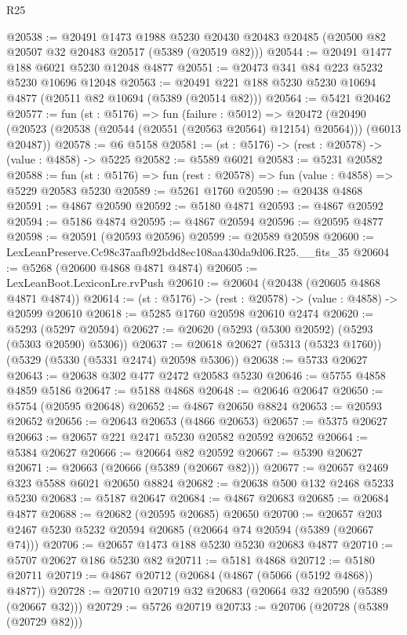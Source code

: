 \begin{lexlean}{R25}
\begin{coremodule}
@20538 := @20491
    @1473
    @1988
    @5230
    @20430
    @20483
    @20485
    (@20500 @82 @20507 @32 @20483 @20517 (@5389 (@20519 @82)))
@20544 := @20491 @1477 @188 @6021 @5230 @12048 @4877
@20551 := @20473 @341 @84 @223 @5232 @5230 @10696 @12048
@20563 := @20491 @221 @188 @5230 @5230 @10694 @4877 (@20511 @82 @10694 (@5389 (@20514 @82)))
@20564 := @5421 @20462
@20577 := fun (st : @5176) =>
  fun (failure : @5012) =>
  @20472 (@20490 (@20523 (@20538 (@20544 (@20551 (@20563 @20564) @12154) @20564))) (@6013 @20487))
@20578 := @6 @5158
@20581 := (st : @5176) -> (rest : @20578) -> (value : @4858) -> @5225
@20582 := @5589 @6021
@20583 := @5231 @20582
@20588 := fun (st : @5176) => fun (rest : @20578) => fun (value : @4858) => @5229 @20583 @5230
@20589 := @5261 @1760
@20590 := @20438 @4868
@20591 := @4867 @20590
@20592 := @5180 @4871
@20593 := @4867 @20592
@20594 := @5186 @4874
@20595 := @4867 @20594
@20596 := @20595 @4877
@20598 := @20591 (@20593 @20596)
@20599 := @20589 @20598
@20600 := LexLeanPreserve.Cc98c37aafb92bdd8ec108aa430da9d06.R25.__fits_35
@20604 := @5268 (@20600 @4868 @4871 @4874)
@20605 := LexLeanBoot.LexiconLre.rvPush
@20610 := @20604 (@20438 (@20605 @4868 @4871 @4874))
@20614 := (st : @5176) -> (rest : @20578) -> (value : @4858) -> @20599 @20610
@20618 := @5285 @1760 @20598 @20610 @2474
@20620 := @5293 (@5297 @20594)
@20627 := @20620 (@5293 (@5300 @20592) (@5293 (@5303 @20590) @5306))
@20637 := @20618 @20627 (@5313 (@5323 @1760)) (@5329 (@5330 (@5331 @2474) @20598 @5306))
@20638 := @5733 @20627
@20643 := @20638 @302 @477 @2472 @20583 @5230
@20646 := @5755 @4858 @4859 @5186
@20647 := @5188 @4868
@20648 := @20646 @20647
@20650 := @5754 (@20595 @20648)
@20652 := @4867 @20650 @8824
@20653 := @20593 @20652
@20656 := @20643 @20653 (@4866 @20653)
@20657 := @5375 @20627
@20663 := @20657 @221 @2471 @5230 @20582 @20592 @20652
@20664 := @5384 @20627
@20666 := @20664 @82 @20592
@20667 := @5390 @20627
@20671 := @20663 (@20666 (@5389 (@20667 @82)))
@20677 := @20657 @2469 @323 @5588 @6021 @20650 @8824
@20682 := @20638 @500 @132 @2468 @5233 @5230
@20683 := @5187 @20647
@20684 := @4867 @20683
@20685 := @20684 @4877
@20688 := @20682 (@20595 @20685) @20650
@20700 := @20657 @203 @2467 @5230 @5232 @20594 @20685 (@20664 @74 @20594 (@5389 (@20667 @74)))
@20706 := @20657 @1473 @188 @5230 @5230 @20683 @4877
@20710 := @5707 @20627 @186 @5230 @82
@20711 := @5181 @4868
@20712 := @5180 @20711
@20719 := @4867 @20712 (@20684 (@4867 (@5066 (@5192 @4868)) @4877))
@20728 := @20710 @20719 @32 @20683 (@20664 @32 @20590 (@5389 (@20667 @32)))
@20729 := @5726 @20719
@20733 := @20706 (@20728 (@5389 (@20729 @82)))

\end{coremodule}
\end{lexlean}
